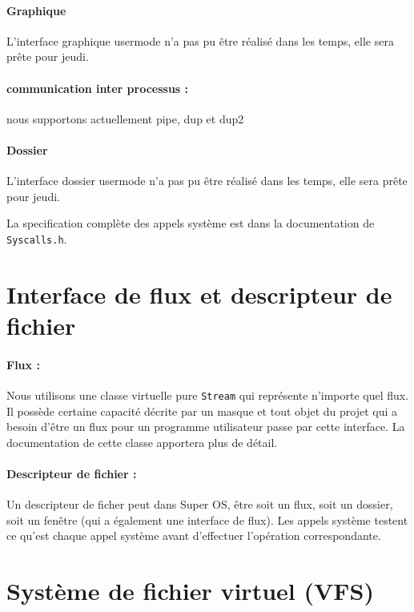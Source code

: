 \documentclass[12pt]{report}
\begin{document}
\paragraph{Graphique} L'interface graphique usermode n'a pas pu être réalisé
dans les temps, elle sera prête pour jeudi.

\paragraph{communication inter processus :} nous supportons actuellement pipe,
dup et dup2 

\paragraph{Dossier} L'interface dossier usermode n'a pas pu être réalisé
dans les temps, elle sera prête pour jeudi.


La specification complète des appels système est dans la documentation de \verb$Syscalls.h$.

\section{Interface de flux et descripteur de fichier}

\paragraph{Flux :} Nous utilisons une classe virtuelle pure \verb$Stream$ qui représente n'importe
quel flux. Il possède certaine capacité décrite par un masque et tout objet du
projet qui a besoin d'être un flux pour un programme utilisateur passe par cette
interface. La documentation de cette classe apportera plus de détail.

\paragraph{Descripteur de fichier :} Un descripteur de ficher peut dans Super
OS, être soit un flux, soit un dossier, soit un fenêtre (qui a également une
interface de flux). Les appels système testent ce qu'est chaque appel système
avant d'effectuer l'opération correspondante.




\section{Système de fichier virtuel (VFS)}
\end{document}
